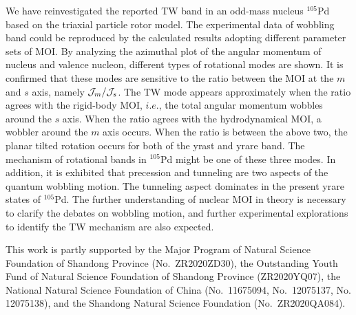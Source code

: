 \documentclass[aps,prc,preprint,showpacs,groupedaddress,floatfix,amsmath,amssymb]{revtex4-1}
\begin{document}
We have reinvestigated the reported  TW band in an odd-mass nucleus $^{105}$Pd based on the triaxial particle rotor model.
The experimental data of wobbling band could be
reproduced by the calculated results adopting different parameter sets of MOI. By analyzing the azimuthal plot of the angular momentum of nucleus and valence nucleon, different types of rotational modes are shown.
It is confirmed that these modes are sensitive to the ratio between the MOI at the $m$ and $s$ axis, namely  ${\cal J}_{m}/{\cal J}_{s}$.
The TW mode appears approximately when the ratio agrees with the rigid-body MOI, $i.e.$, the total angular momentum   wobbles around the $s$ axis.
When the ratio agrees with the hydrodynamical MOI, a wobbler around the $m$ axis occurs. When the ratio is between the above two, the planar tilted rotation occurs for both of the yrast and yrare band.
The mechanism of rotational bands in $^{105}$Pd might be one of these three modes. In addition, it is exhibited that
precession and tunneling are two aspects of the quantum wobbling motion. The tunneling aspect dominates
in the present yrare states of $^{105}$Pd.
The further understanding of nuclear MOI in theory is necessary to clarify the debates on wobbling motion, and further experimental explorations to identify the TW mechanism are also expected.


\begin{acknowledgments}
This work is partly supported by the Major Program of Natural Science Foundation of
Shandong Province (No.~ZR2020ZD30), the Outstanding Youth Fund of Natural Science Foundation
of Shandong Province (ZR2020YQ07), the National Natural Science Foundation of China
(No.~11675094, No.~12075137, No. 12075138), and the Shandong Natural Science Foundation (No.~ZR2020QA084).
\end{acknowledgments}

\clearpage
\end{document}

